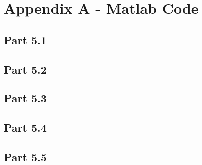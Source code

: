 \appendix



\section{Appendix A - Matlab Code}
\label{sec:Appendix A}
\begin{subappendices}
\subsection{Part 5.1}

\subsection{Part 5.2}


\subsection{Part 5.3}

\subsection{Part 5.4}

\subsection{Part 5.5}

\end{subappendices}

